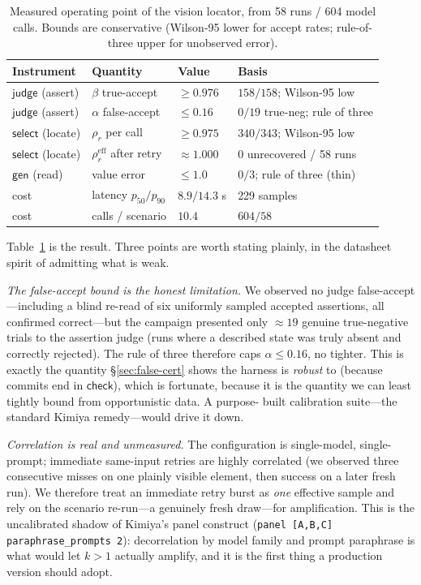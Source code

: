 \documentclass[acmsmall,screen,nonacm]{acmart}
\newcommand{\gen}{\mathsf{gen}}
\newcommand{\checkk}{\mathsf{check}}
\newcommand{\judge}{\mathsf{judge}}
\newcommand{\select}{\mathsf{select}}
\theoremstyle{acmdefinition}%
\theoremstyle{acmplain}%
\begin{document}
\begin{table}[t]\small
\caption{Measured operating point of the vision locator, from 58 runs /
604 model calls. Bounds are conservative (Wilson-95 lower for accept
rates; rule-of-three upper for unobserved error).}
\label{tab:sheet}
\begin{tabular}{@{}llll@{}}
\toprule
Instrument & Quantity & Value & Basis \\
\midrule
$\judge$ (assert) & $\beta$ true-accept & $\ge 0.976$ & $158/158$; Wilson-95 low \\
$\judge$ (assert) & $\alpha$ false-accept & $\le 0.16$ & $0/19$ true-neg; rule of three \\
$\select$ (locate) & $\rho_r$ per call & $\ge 0.975$ & $340/343$; Wilson-95 low \\
$\select$ (locate) & $\rho_r^{\mathrm{eff}}$ after retry & $\approx 1.000$ & $0$ unrecovered / 58 runs \\
$\gen$ (read) & value error & $\le 1.0$ & $0/3$; rule of three (thin) \\
cost & latency $p_{50}/p_{90}$ & $8.9/14.3$ s & 229 samples \\
cost & calls / scenario & $10.4$ & $604/58$ \\
\bottomrule
\end{tabular}
\end{table}

Table~\ref{tab:sheet} is the result. Three points are worth stating
plainly, in the datasheet spirit of admitting what is weak.

\emph{The false-accept bound is the honest limitation.} We observed no
judge false-accept---including a blind re-read of six uniformly sampled
accepted assertions, all confirmed correct---but the campaign presented
only $\approx 19$ genuine true-negative trials to the assertion judge
(runs where a described state was truly absent and correctly rejected). The
rule of three therefore caps $\alpha\le 0.16$, no tighter. This is exactly
the quantity \S\ref{sec:false-cert} shows the harness is \emph{robust} to
(because commits end in $\checkk$), which is fortunate, because it is the
quantity we can least tightly bound from opportunistic data. A purpose-
built calibration suite---the standard Kimiya remedy---would drive it down.

\emph{Correlation is real and unmeasured.} The configuration is
single-model, single-prompt; immediate same-input retries are highly
correlated (we observed three consecutive misses on one plainly visible
element, then success on a later fresh run). We therefore treat an
immediate retry burst as \emph{one} effective sample and rely on the
scenario re-run---a genuinely fresh draw---for amplification. This is the
uncalibrated shadow of Kimiya's panel construct
(\lstinline|panel [A,B,C] paraphrase_prompts 2|): decorrelation by model
family and prompt paraphrase is what would let $k>1$ actually amplify, and
it is the first thing a production version should adopt.
\end{document}
